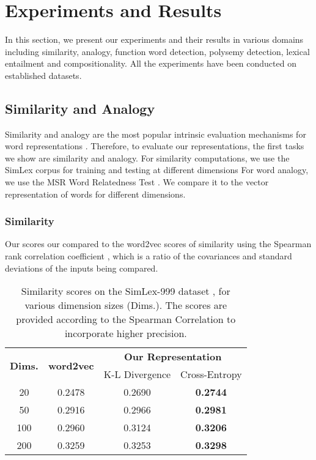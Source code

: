 \documentclass[11pt,a4paper]{article}
\begin{document}

\section{Experiments and Results}
\label{sec: results}

In this section, we present our experiments and their results in various domains including similarity, analogy, function word detection, polysemy detection, lexical entailment and compositionality. All the experiments have been conducted on established datasets.

\subsection{Similarity and Analogy}
\label{ssec: sim-anal}

Similarity and analogy are the most popular intrinsic evaluation mechanisms for word representations \citep{mikolov2013efficient}. Therefore, to evaluate our representations, the first tasks we show are similarity and analogy. For similarity computations, we use the SimLex corpus \citep{hill2015simlex} for training and testing at different dimensions For word analogy, we use the MSR Word Relatedness Test \citep{mikolov2013linguistic}. We compare it to the vector representation of words for different dimensions.

\subsubsection{Similarity} 

Our scores our compared to the word2vec scores of similarity using the Spearman rank correlation coefficient \citep{spearman1987proof}, which is a ratio of the covariances and standard deviations of the inputs being compared. 

\begin{table}[]
    \centering
    {\small
    \begin{tabular}{c|c|cc}
        \multirow{2}{*}{\bf Dims.}   & \multirow{2}{*}{\bf word2vec} & \multicolumn{2}{c}{\bf Our Representation} \\ \cline{3-4}
                            &                               & K-L Divergence & Cross-Entropy \\\hline
        20  &   0.2478   & 0.2690 & \bf 0.2744    \\
        50  &   0.2916   & 0.2966 & \bf 0.2981    \\
        100 &   0.2960   & 0.3124 & \bf 0.3206    \\
        200 &   0.3259   & 0.3253 & \bf 0.3298    
    \end{tabular}
    }
    \caption{Similarity scores on the SimLex-999 dataset \citep{hill2015simlex}, for various dimension sizes (Dims.). The scores are provided according to the Spearman Correlation to incorporate higher precision.}
    \label{tab: similarity scores}
\end{table}
\end{document}
